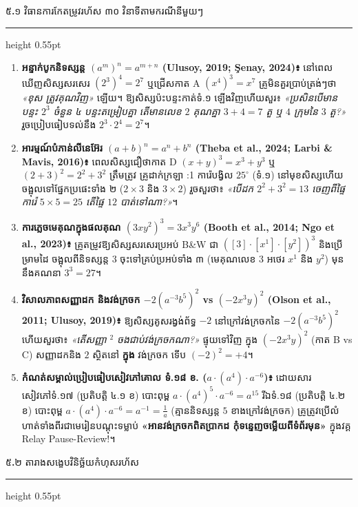 \documentclass[a4paper,12pt]{article}
\newcommand{\en}[1]{{\TimesEn #1}}
\newcommand{\enbf}[1]{{\TimesEn\textbf{#1}}}
\newcommand{\subsectitle}[1]{{\muol\fontsize{11.5pt}{18.5pt}\selectfont #1}}
\newcommand{\subsec}[1]{%
  \Needspace{1.7cm}%
  \vspace{3pt}%
  \subsectitle{#1}\par%
  \vspace{-2pt}%
  {\color{black}\hrule height 0.55pt}%
  \vspace{3pt}%
}
\begin{document}
\subsec{៥\enbf{.}១ វិធានការកែតម្រូវរហ័ស ៣០ វិនាទីតាមករណីនីមួយៗ}

\begin{enumerate}[leftmargin=0.65cm]
  \item \textbf{អន្ទាក់បូកនិទស្សន្ត $(a^m)^n = a^{m+n}$ (\en{Ulusoy, 2019; Şenay, 2024})៖} នៅពេលឃើញសិស្សសរសេរ $(2^3)^4=2^7$ ឬជ្រើសកាត \en{A} $(x^4)^3=x^7$ គ្រូមិនគួរប្រាប់ត្រង់ៗថា \textit{«ខុស ត្រូវគុណវិញ»} ឡើយ។ ឱ្យសិស្សប៉ះបន្ទះកាត់ទំ.១ ឡើងវិញហើយសួរ៖ \textit{«ប្រសិនបើមានបន្ទះ $2^3$ ចំនួន ៤ បន្ទះតម្រៀបគ្នា តើមានលេខ $2$ គុណគ្នា $3+4=7$ តួ ឬ $4$ ក្រុមនៃ $3$ តួ?»} រួចប្រៀបធៀបទល់នឹង $2^3\cdot 2^4 = 2^7$។
  \item \textbf{អារម្មណ៍បំភាន់លីនេអ៊ែរ $(a+b)^n = a^n+b^n$ (\en{Theba et al., 2024; Larbi \& Mavis, 2016})៖} ពេលសិស្សជឿថាកាត \en{D} $(x+y)^3=x^3+y^3$ ឬ $(2+3)^2=2^2+3^2$ ត្រឹមត្រូវ គ្រូដាក់ក្រឡា \en{1:1} ការ៉េបង្វិល $25^\circ$ (ទំ.១) នៅមុខសិស្សហើយចង្អុលទៅផ្នែកប្រផេះទាំង ២ ($2\times 3$ និង $3\times 2$) រួចសួរថា៖ \textit{«បើដក $2^2+3^2=13$ ចេញពីផ្ទៃការ៉េ $5\times 5=25$ តើផ្ទៃ $12$ បាត់ទៅណា?»}។
  \item \textbf{ការភ្លេចមេគុណក្នុងផលគុណ $(3xy^2)^3 = 3x^3y^6$ (\en{Booth et al., 2014; Ngo et al., 2023})៖} គ្រូតម្រូវឱ្យសិស្សសរសេរប្រអប់ \en{B\&W} ជា $([3]\cdot[x^1]\cdot[y^2])^3$ និងប្រើម្រាមដៃ \en{[tracing]} ចង្អុលពីនិទស្សន្ត $3$ ចុះទៅគ្រប់ប្រអប់ទាំង ៣ (មេគុណលេខ $3$ អថេរ $x^1$ និង $y^2$) មុននឹងគណនា $3^3=27$។
  \item \textbf{វិសាលភាពសញ្ញាដក និងវង់ក្រចក $-2(a^{-3}b^5)^2$ vs $(-2x^3y)^2$ (\en{Olson et al., 2011; Ulusoy, 2019})៖} ឱ្យសិស្សគូសរង្វង់ព័ទ្ធ $-2$ នៅក្រៅវង់ក្រចកនៃ $-2(a^{-3}b^5)^2$ ហើយសួរថា៖ \textit{«តើសញ្ញា $^2$ ចងជាប់វង់ក្រចកណា?»} ផ្ទុយទៅវិញ ក្នុង $(-2x^3y)^2$ (កាត \en{B} vs \en{C}) សញ្ញាដកនិង $2$ ស្ថិតនៅ \textbf{ក្នុង} វង់ក្រចក ទើប $(-2)^2 = +4$។
  \item \textbf{កំណត់សម្គាល់ប្រៀបធៀបសៀវភៅគោល ទំ.១៨ ខ. ($a\cdot(a^4)\cdot a^{-6}$)៖} ដោយសារសៀវភៅទំ.១៧ (ប្រតិបត្តិ ៤.១ ខ) បោះពុម្ព $a\cdot(a^4)^5\cdot a^{-6} = a^{15}$ រីឯទំ.១៨ (ប្រតិបត្តិ ៤.២ ខ) បោះពុម្ព $a\cdot(a^4)\cdot a^{-6} = a^{-1} = \frac{1}{a}$ (គ្មាននិទស្សន្ត $5$ ខាងក្រៅវង់ក្រចក) គ្រូត្រូវប្រើលំហាត់ទាំងពីរជាមេរៀនបណ្ដុះទម្លាប់ \textbf{«អានវង់ក្រចកពិតប្រាកដ កុំទន្ទេញចម្លើយពីទំព័រមុន»} ក្នុងវគ្គ \en{Relay Pause-Review!}។
\end{enumerate}

\subsec{៥\enbf{.}២ តារាងសង្ខេបវិនិច្ឆ័យកំហុសរហ័ស}
\end{document}
